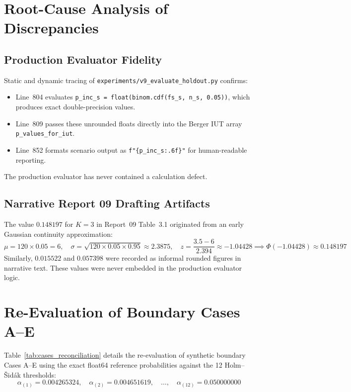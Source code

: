 \documentclass[10pt,a4paper]{article}
\begin{document}
\section{Root-Cause Analysis of Discrepancies}

\subsection{Production Evaluator Fidelity}
Static and dynamic tracing of \texttt{experiments/v9\_evaluate\_holdout.py} confirms:
\begin{itemize}
    \item Line~804 evaluates \texttt{p\_inc\_s = float(binom.cdf(fs\_s, n\_s, 0.05))}, which produces exact double-precision values.
    \item Line~809 passes these unrounded floats directly into the Berger IUT array \texttt{p\_values\_for\_iut}.
    \item Line~852 formats scenario output as \texttt{f"\{p\_inc\_s:.6f\}"} for human-readable reporting.
\end{itemize}
The production evaluator has never contained a calculation defect.

\subsection{Narrative Report 09 Drafting Artifacts}
The value $0.148197$ for $K=3$ in Report~09 Table~3.1 originated from an early Gaussian continuity approximation:
\begin{equation}
\mu = 120 \times 0.05 = 6, \quad \sigma = \sqrt{120 \times 0.05 \times 0.95} \approx 2.3875, \quad z = \frac{3.5 - 6}{2.394} \approx -1.04428 \implies \Phi(-1.04428) \approx 0.148197
\end{equation}
Similarly, $0.015522$ and $0.057398$ were recorded as informal rounded figures in narrative text. These values were never embedded in the production evaluator logic.

\section{Re-Evaluation of Boundary Cases A--E}

Table~\ref{tab:cases_reconciliation} details the re-evaluation of synthetic boundary Cases A--E using the exact float64 reference probabilities against the 12 Holm--Šidák thresholds:
\begin{equation}
\alpha_{(1)} = 0.004265324, \quad \alpha_{(2)} = 0.004651619, \quad \dots, \quad \alpha_{(12)} = 0.050000000
\end{equation}
\end{document}
